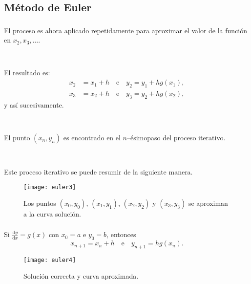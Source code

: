 \subsection{Método de Euler}

\begin{frame}
	\frametitle{\subsecname}
	\begin{minipage}{0.45\paperwidth}
		El proceso es ahora aplicado repetidamente para aproximar el valor de la función en $x_{2},x_{3},\ldots$.

		\

		El resultado es:
		\begin{align*}
		x_{2}&=x_{1}+h\quad\text{e}\quad y_{2}=y_{1}+hg\left(x_{1}\right),\\
		x_{3}&=x_{2}+h\quad\text{e}\quad y_{3}=y_{2}+hg\left(x_{2}\right),
		\end{align*}
		y así sucesivamente.

		\

		El punto $\left(x_{n},y_{n}\right)$ es encontrado en el $n$--ésimo\linebreak paso del proceso iterativo.

		\

		Este proceso iterativo se puede resumir de la \linebreak siguiente manera.
	\end{minipage}
	\hfill
	\begin{minipage}{0.45\paperwidth}
		\begin{figure}
			\centering
			\texttt{[image: euler3]}
			\caption{Los puntos $\left(x_{0},y_{0}\right)$, $\left(x_{1},y_{1}\right)$, $\left(x_{2},y_{2}\right)$ y $\left(x_{3},y_{3}\right)$ se aproximan a la curva solución.}
		\end{figure}
	\end{minipage}
\end{frame}

\begin{frame}
\frametitle{\subsecname}

\begin{minipage}{0.45\paperwidth}
	\begin{theorem}
			Si $\frac{\mathrm{d}y}{\mathrm{d}x}=g\left(x\right)$ con $x_{0}=a$ e $y_{0}=b$, entonces \[ x_{n+1}=x_{n}+h\quad\text{e}\quad y_{n+1}=hg\left(x_{n}\right). \]
	\end{theorem}
\end{minipage}
\hfill
\begin{minipage}{0.45\paperwidth}
	\begin{figure}
		\centering
		\texttt{[image: euler4]}
		\caption{Solución correcta y curva aproximada.}
	\end{figure}
\end{minipage}
\end{frame}

